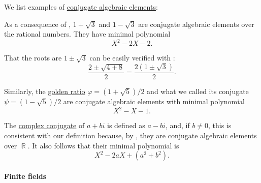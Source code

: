 \begin{example}\label{ex:def:conjugate_field_extension_element}
  We list examples of \hyperref[def:conjugate_field_extension_element]{conjugate algebraic elements}:
  \begin{thmenum}
     As a consequence of , \( 1 + \sqrt 3 \) and \( 1 - \sqrt 3 \) are conjugate algebraic elements over the rational numbers. They have minimal polynomial
    \begin{equation*}
      X^2 - 2X - 2.
    \end{equation*}

    That the roots are \( 1 \pm \sqrt 3 \) can be easily verified with :
    \begin{equation*}
      \frac {2 \pm \sqrt{ 4 + 8 }} 2 = \frac {2 (1 \pm \sqrt 3)} 2.
    \end{equation*}

     Similarly, the \hyperref[def:golden_ratio]{golden ratio} \( \varphi = (1 + \sqrt 5) / 2 \) and what we called its conjugate \( \psi = (1 - \sqrt 5) / 2 \) are conjugate algebraic elements with minimal polynomial
    \begin{equation*}
      X^2 - X - 1.
    \end{equation*}

     The \hyperref[def:complex_conjugate]{complex conjugate} of \( a + bi \) is defined as \( a - bi \), and, if \( b \neq 0 \), this is consistent with our definition because, by , they are conjugate algebraic elements over \( \BbbR \). It also follows that their minimal polynomial is
    \begin{equation*}
      X^2 - 2aX + (a^2 + b^2).
    \end{equation*}
  \end{thmenum}
\end{example}

\paragraph{Finite fields}

